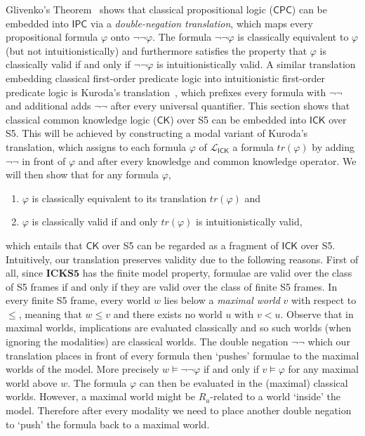 \documentclass{myifcolog}
\newcommand{\agi}{a}
\newcommand{\ICK}{\mathsf{ICK}}
\newcommand{\LICK}{\mathcal{L}_{\ICK}}
\numberwithin{theorem}{section}
\begin{document}
 Glivenko's Theorem~\cite{Glivenko_1929} shows that classical propositional logic ($\mathsf{CPC}$) can be embedded into $\mathsf{IPC}$ via a \emph{double-negation translation}, which maps every propositional formula $\varphi$ onto $\neg \neg \varphi$. The formula $\neg \neg \varphi$ is classically equivalent to $\varphi$ (but not intuitionistically) and furthermore satisfies the property that $\varphi$ is classically valid if and only if $\neg \neg \varphi$ is intuitionistically valid. A similar translation embedding classical first-order predicate logic into intuitionistic first-order predicate logic is Kuroda's translation~\cite{kuroda_1951}, which prefixes every formula with $\neg \neg$ and additional adds $\neg \neg$ after every universal quantifier. This section shows that classical common knowledge logic ($\mathsf{CK}$) over S5 can be embedded into $\mathsf{ICK}$ over S5. This will be achieved by constructing a modal variant of Kuroda's translation, which assigns to each formula $\varphi$ of $\LICK$ a formula $tr(\varphi)$ by adding $\neg \neg$ in front of $\varphi$ and after every knowledge and common knowledge operator. We will then show that for any formula $\varphi$,
    \begin{enumerate}
        \item $\varphi$ is classically equivalent to its translation $tr(\varphi)$ and
        \item  $\varphi$ is classically valid if and only $tr(\varphi)$ is intuitionistically valid,
    \end{enumerate}
    which entails that $\mathsf{CK}$ over S5 can be regarded as a fragment of $\mathsf{ICK}$ over S5. Intuitively, our translation preserves validity due to the following reasons. First of all, since $\mathbf{ICKS5}$ has the finite model property, formulae are valid over the class of S5 frames if and only if they are valid over the class of finite S5 frames. In every finite S5 frame, every world $w$ lies below a \emph{maximal world} $v$ with respect to $\leq$, meaning that $w \leq v$ and there exists no world $u$ with $v < u$. Observe that in maximal worlds, implications are evaluated classically and so such worlds (when ignoring the modalities) are classical worlds. The double negation $\neg \neg$ which our translation places in front of every formula then `pushes' formulae to the maximal worlds of the model. More precisely $w \models \neg \neg \varphi$ if and only if $v \models \varphi$ for any maximal world above $w$. The formula $\varphi$ can then be evaluated in the (maximal) classical worlds. However, a maximal world might be $R_\agi$-related to a world `inside' the model. Therefore after every modality we need to place another double negation to `push' the formula back to a maximal world.
\end{document}
